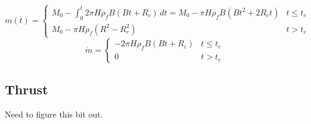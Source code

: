 \documentclass[12pt,a4paper]{article}
\begin{document}
\begin{equation}
m(t) = \begin{cases}
M_0 - \int_0^t 2\pi H \rho_f B (Bt+R_c)\,dt = M_0 - \pi H \rho_f B (Bt^2+2R_c t) & t \le t_e \\
M_0 - \pi H \rho_f (R^2 - R_c^2)                                                 & t > t_e
\end{cases}
\label{eq:mass}
\end{equation}
\begin{equation}
\dot{m} = \begin{cases}
-2 \pi H \rho_f B (Bt + R_c) & t\le t_e \\
0                            & t > t_e
\end{cases}
\label{eq:mdot}
\end{equation}

\subsection{Thrust}

Need to figure this bit out.

\end{document}
